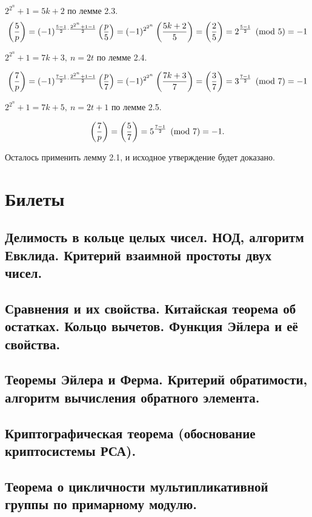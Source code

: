 \documentclass[a4paper,11pt,openany]{book}
\begin{document}
$2^{2^n} + 1 = 5k + 2$ по лемме 2.3.
$$\left( \frac{5}{p} \right) = (-1) ^ {\frac{5 - 1}{2} \cdot \frac{2^{2^n} + 1 - 1}{2}} \left( \frac{p}{5} \right) = (-1) ^ {2^{2^n}} \left( \frac{5k+2}{5} \right) = \left( \frac{2}{5} \right) = 2^{\frac{5-1}{2}} \pmod 5= -1$$

$2^{2^n} + 1 = 7k + 3,\ n = 2t$ по лемме 2.4.

$$\left( \frac{7}{p} \right) = (-1) ^ {\frac{7 - 1}{2} \cdot \frac{2^{2^n} + 1 - 1}{2}} \left( \frac{p}{7} \right) = (-1) ^ {2^{2^n}} \left( \frac{7k+3}{7} \right) = \left( \frac{3}{7} \right) = 3^{\frac{7-1}{2}} \pmod 7 = -1$$

$2^{2^n} + 1 = 7k + 5,\ n = 2t + 1$ по лемме 2.5.

$$\left( \frac{7}{p} \right) = \left( \frac{5}{7} \right) = 5^{\frac{7-1}{2}} \pmod 7 = -1.$$

Осталось применить лемму 2.1, и исходное утверждение будет доказано.

\newpage
\chapter{Билеты}
\section{Делимость в кольце целых чисел. НОД, алгоритм Евклида. Критерий взаимной простоты двух чисел.}


\section{Сравнения и их свойства. Китайская теорема об остатках. Кольцо вычетов. Функция Эйлера и её свойства.}
\section{Теоремы Эйлера и Ферма. Критерий обратимости, алгоритм вычисления обратного элемента.}
\section{Криптографическая теорема (обоснование криптосистемы РСА).}
\section{Теорема о цикличности мультипликативной группы по примарному модулю.}
\end{document}
